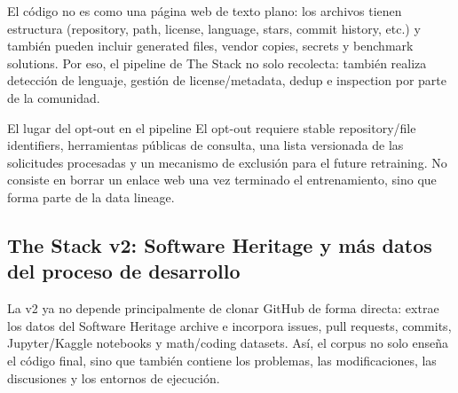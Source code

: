 El código no es como una página web de texto plano: los archivos tienen estructura (repository, path, license, language, stars, commit history, etc.) y también pueden incluir generated files, vendor copies, secrets y benchmark solutions. Por eso, el pipeline de The Stack no solo recolecta: también realiza detección de lenguaje, gestión de license/metadata, dedup e inspection por parte de la comunidad.



\begin{knowledgebox}{El lugar del opt-out en el pipeline}
El opt-out requiere stable repository/file identifiers, herramientas públicas de consulta, una lista versionada de las solicitudes procesadas y un mecanismo de exclusión para el future retraining. No consiste en borrar un enlace web una vez terminado el entrenamiento, sino que forma parte de la data lineage.
\end{knowledgebox}


\subsection{The Stack v2: Software Heritage y más datos del proceso de desarrollo}

La v2 ya no depende principalmente de clonar GitHub de forma directa: extrae los datos del Software Heritage archive e incorpora issues, pull requests, commits, Jupyter/Kaggle notebooks y math/coding datasets. Así, el corpus no solo enseña el código final, sino que también contiene los problemas, las modificaciones, las discusiones y los entornos de ejecución.



